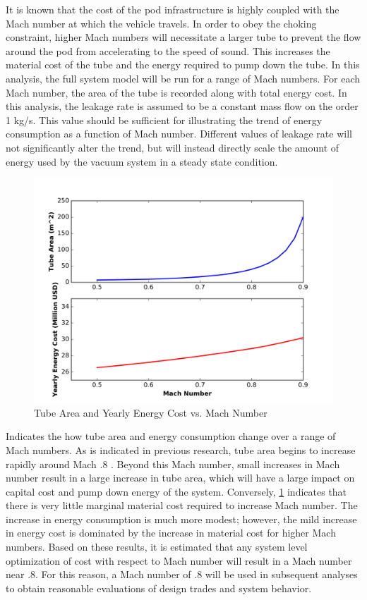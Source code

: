 It is known that the cost of the pod infrastructure is highly coupled with the Mach number at which the vehicle travels. In order to obey the choking constraint, higher Mach numbers will necessitate a larger tube to prevent the flow around the pod from accelerating to the speed of sound. This increases the material cost of the tube and the energy required to pump down the tube. In this analysis, the full system model will be run for a range of Mach numbers. For each Mach number, the area of the tube is recorded along with total energy cost. In this analysis, the leakage rate is assumed to be a constant mass flow on the order 1 kg/s. This value should be sufficient for illustrating the trend of energy consumption as a function of Mach number. Different values of leakage rate will not significantly alter the trend, but will instead directly scale the amount of energy used by the vacuum system in a steady state condition.
\begin{figure}
	\centering
	\includegraphics{../../images/graphs/mach_trades/pressure_vs_mach.png}
	\caption{Tube Area and Yearly Energy Cost vs. Mach Number}
	\label{fig:tube_area_cost_vs_mach}
\end{figure}
 Indicates the how tube area and energy consumption change over a range of Mach numbers. As is indicated in previous research, tube area begins to increase rapidly around Mach .8 \cite{Chin}. Beyond this Mach number, small increases in Mach number result in a large increase in tube area, which will have a large impact on capital cost and pump down energy of the system. Conversely, \cref{fig:tube_area_cost_vs_mach} indicates that there is very little marginal material cost required to increase Mach number. The increase in energy consumption is much more modest; however, the mild increase in energy cost is dominated by the increase in material cost for higher Mach numbers. Based on these results, it is estimated that any system level optimization of cost with respect to Mach number will result in a Mach number near .8. For this reason, a Mach number of .8 will be used in subsequent analyses to obtain reasonable evaluations of design trades and system behavior.
